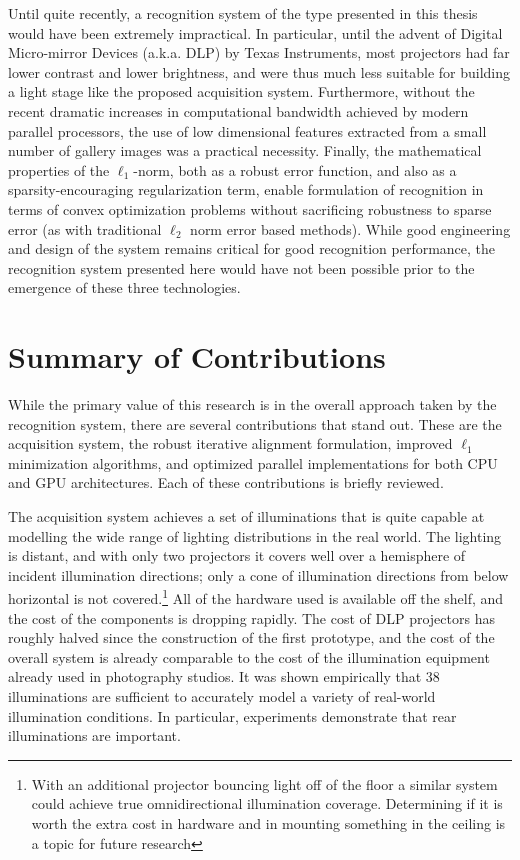 Until quite recently, a recognition system of the type presented in this thesis
would have been extremely impractical.  In particular, until the advent of
Digital Micro-mirror Devices (a.k.a. DLP) by Texas Instruments, most projectors
had far lower contrast and lower brightness, and were thus much less suitable
for building a light stage like the proposed acquisition system.  Furthermore,
without the recent dramatic increases in computational bandwidth achieved by
modern parallel processors, the use of low dimensional features extracted from
a small number of gallery images was a practical necessity.  Finally, the
mathematical properties of the $\ell_1$-norm, both as a robust error function,
and also as a sparsity-encouraging regularization term, enable formulation of
recognition in terms of convex optimization problems without sacrificing
robustness to sparse error (as with traditional $\ell_2$ norm error based
methods).  While good engineering and design of the system remains critical for
good recognition performance, the recognition system presented here would have
not been possible prior to the emergence of these three technologies.

\section{Summary of Contributions}
While the primary value of this research is in the overall approach taken by
the recognition system, there are several contributions that stand out.  These
are the acquisition system, the robust iterative alignment formulation,
improved $\ell_1$ minimization algorithms, and optimized parallel
implementations for both CPU and GPU architectures.  Each of these
contributions is briefly reviewed.

The acquisition system achieves a set of illuminations that is quite capable at
modelling the wide range of lighting distributions in the real world.  The
lighting is distant, and with only two projectors it covers well over a
hemisphere of incident illumination directions; only a cone of illumination
directions from below horizontal is not covered.\footnote{With an additional
projector bouncing light off of the floor a similar system could achieve true
omnidirectional illumination coverage.  Determining if it is worth the extra
cost in hardware and in mounting something in the ceiling is a topic for future
research}  All of the hardware used is available off the shelf, and the cost of
the components is dropping rapidly.  The cost of DLP projectors has roughly
halved since the construction of the first prototype, and the cost of the
overall system is already comparable to the cost of the illumination equipment
already used in photography studios.  It was shown empirically that 38
illuminations are sufficient to accurately model a variety of real-world
illumination conditions.  In particular, experiments demonstrate that rear
illuminations are important.

